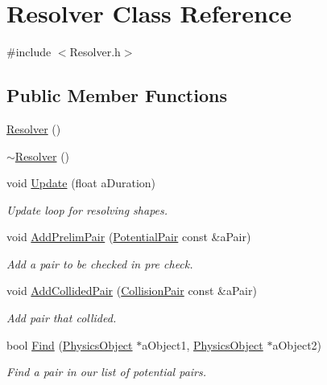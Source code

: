 \hypertarget{classResolver}{}\section{Resolver Class Reference}
\label{classResolver}


{\ttfamily \#include $<$Resolver.\+h$>$}

\subsection*{Public Member Functions}
\begin{DoxyCompactItemize}
\item 
\hyperlink{classResolver_a19068f3ea9b219a8a9a254d227451d17}{Resolver} ()
\item 
\hyperlink{classResolver_acbb5f19d83d3d7caa91534c96cb73d68}{$\sim$\+Resolver} ()
\item 
void \hyperlink{classResolver_a397db1928dfbb57afdbe06198b0fc0ff}{Update} (float a\+Duration)
\begin{DoxyCompactList}\small\item\em Update loop for resolving shapes. \end{DoxyCompactList}\item 
void \hyperlink{classResolver_a7e5d20676229e996f2705a3948f7ea7c}{Add\+Prelim\+Pair} (\hyperlink{structPotentialPair}{Potential\+Pair} const \&a\+Pair)
\begin{DoxyCompactList}\small\item\em Add a pair to be checked in pre check. \end{DoxyCompactList}\item 
void \hyperlink{classResolver_ac7cb738bf2e6e159ed6aac7838b819c9}{Add\+Collided\+Pair} (\hyperlink{structCollisionPair}{Collision\+Pair} const \&a\+Pair)
\begin{DoxyCompactList}\small\item\em Add pair that collided. \end{DoxyCompactList}\item 
bool \hyperlink{classResolver_aee1c829f8d576d471bebe719610fbadf}{Find} (\hyperlink{classPhysicsObject}{Physics\+Object} $\ast$a\+Object1, \hyperlink{classPhysicsObject}{Physics\+Object} $\ast$a\+Object2)
\begin{DoxyCompactList}\small\item\em Find a pair in our list of potential pairs. \end{DoxyCompactList}\end{DoxyCompactItemize}
